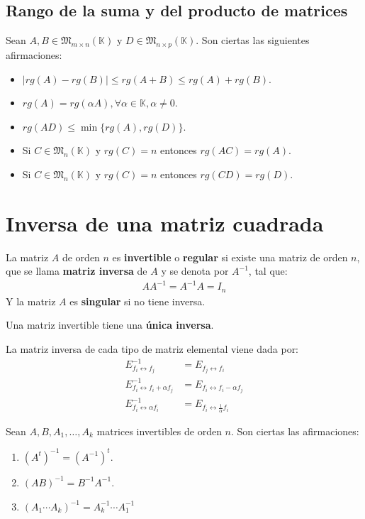 \subsection{Rango de la suma y del producto de matrices}


Sean $A, B \in \mathfrak{M}_{m \times n}(\mathbb{K})$ y $D \in \mathfrak{M}_{n \times p}(\mathbb{K})$. Son ciertas las siguientes afirmaciones:
\begin{itemize}
\item $|rg(A)-rg(B)| \leq rg(A+B) \leq rg(A) + rg(B)$.
\item $rg(A) = rg(\alpha A), \forall \alpha \in \mathbb{K}, \alpha \neq 0$.
\item $rg(AD) \leq \min\{rg(A),rg(D)\}$.
\item Si $C \in \mathfrak{M}_n(\mathbb{K})$ y $rg(C)=n$ entonces $rg(AC)=rg(A)$.
\item Si $C \in \mathfrak{M}_n(\mathbb{K})$ y $rg(C)=n$ entonces $rg(CD)=rg(D)$.
\end{itemize}


\section{Inversa de una matriz cuadrada}

La matriz $A$ de orden $n$ es \textbf{invertible} o \textbf{regular} si existe una matriz de orden $n$, que se llama \textbf{matriz inversa} de $A$ y se denota por $A^{-1}$, tal que:
\begin{align*}
AA^{-1}=A^{-1}A=I_n
\end{align*}
Y la matriz $A$ es \textbf{singular} si no tiene inversa.


Una matriz invertible tiene una \textbf{única inversa}.



La matriz inversa de cada tipo de matriz elemental viene dada por:
\begin{align*}
E^{-1}_{f_i \leftrightarrow f_j} &= E_{f_j \leftrightarrow f_i} \\
E^{-1}_{f_i \leftrightarrow f_i + \alpha f_j} &= E_{f_i \leftrightarrow f_i - \alpha f_j} \\
E^{-1}_{f_i \leftrightarrow \alpha f_i} &= E_{f_i \leftrightarrow \frac{1}{\alpha} f_i}
\end{align*}

Sean $A,B,A_1,\ldots,A_k$ matrices invertibles de orden $n$. Son ciertas las afirmaciones:
\begin{enumerate}
\item $(A^t)^{-1}=(A^{-1})^t$.
\item $(AB)^{-1}=B^{-1}A^{-1}$.
\item $(A_1 \cdots A_k)^{-1}=A_k^{-1} \cdots A_1^{-1}$
\end{enumerate}

